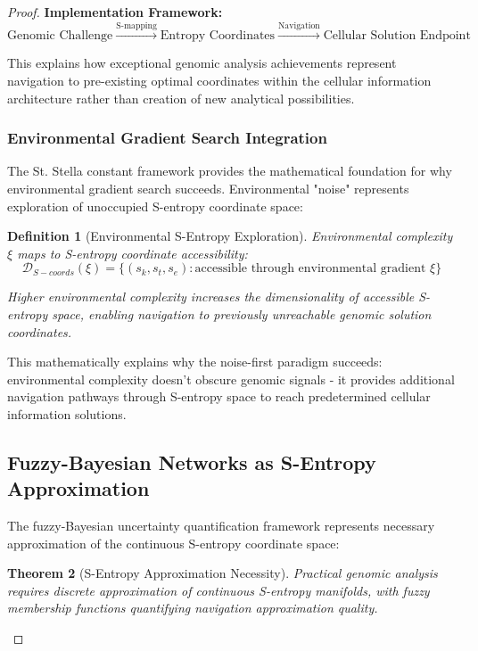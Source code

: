 \documentclass[12pt,a4paper]{article}
\newtheorem{theorem}{Theorem}[section]
\newtheorem{definition}[theorem]{Definition}
\begin{document}
\begin{proof}
\textbf{Implementation Framework:}
$$\text{Genomic Challenge} \xrightarrow{\text{S-mapping}} \text{Entropy Coordinates} \xrightarrow{\text{Navigation}} \text{Cellular Solution Endpoint}$$

This explains how exceptional genomic analysis achievements represent navigation to pre-existing optimal coordinates within the cellular information architecture rather than creation of new analytical possibilities.

\subsubsection{Environmental Gradient Search Integration}

The St. Stella constant framework provides the mathematical foundation for why environmental gradient search succeeds. Environmental "noise" represents exploration of unoccupied S-entropy coordinate space:

\begin{definition}[Environmental S-Entropy Exploration]
Environmental complexity $\xi$ maps to S-entropy coordinate accessibility:
$$\mathcal{D}_{S-coords}(\xi) = \{(s_k, s_t, s_e) : \text{accessible through environmental gradient } \xi\}$$

Higher environmental complexity increases the dimensionality of accessible S-entropy space, enabling navigation to previously unreachable genomic solution coordinates.
\end{definition}

This mathematically explains why the noise-first paradigm succeeds: environmental complexity doesn't obscure genomic signals - it provides additional navigation pathways through S-entropy space to reach predetermined cellular information solutions.

\subsection{Fuzzy-Bayesian Networks as S-Entropy Approximation}

The fuzzy-Bayesian uncertainty quantification framework represents necessary approximation of the continuous S-entropy coordinate space:

\begin{theorem}[S-Entropy Approximation Necessity]
Practical genomic analysis requires discrete approximation of continuous S-entropy manifolds, with fuzzy membership functions quantifying navigation approximation quality.
\end{theorem}


\end{proof}
\end{document}
